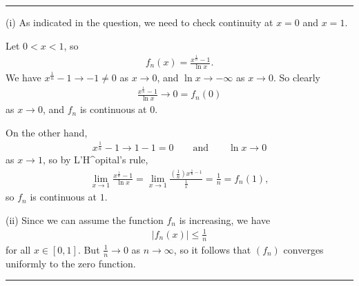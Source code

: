 \documentclass[letterpaper,10pt,english]{jupyterBook}
\begin{document}
\bigskip\hrule\bigskip


\sphinxAtStartPar
{\hyperref[\detokenize{Problems:id59}]{}}
(i) As indicated in the question, we need to check continuity at \(x=0\) and \(x=1\).

Let \(0<x<1\), so
\begin{equation*}
\begin{split}
f_n(x) = \frac{x^{\frac{1}{n}}-1}{\ln x}.
\end{split}
\end{equation*}
\sphinxAtStartPar
We have \(x^{\frac{1}{n}} -1 \rightarrow -1 \neq 0\) as \(x\rightarrow 0\), and \(\ln x\rightarrow -\infty\) as \(x\rightarrow 0\). So clearly
\begin{equation*}
\begin{split}
\frac{x^{\frac{1}{n}}-1}{\ln x} \rightarrow 0 =f_n(0)
\end{split}
\end{equation*}
\sphinxAtStartPar
as \(x\rightarrow 0\), and \(f_n\) is continuous at \(0\).

On the other hand,
\begin{equation*}
\begin{split}
x^{\frac{1}{n}} -1 \rightarrow 1-1=0 \qquad \text{and}\qquad \ln x\rightarrow 0
\end{split}
\end{equation*}
\sphinxAtStartPar
as \(x\rightarrow 1\), so by L’H\textasciicircum{}opital’s rule,
\begin{equation*}
\begin{split}
\lim_{x\rightarrow 1} \frac{x^{\frac{1}{n}} -1}{\ln x} = \lim_{x\rightarrow 1} \frac{\left(\frac{1}{n}\right)x^{\frac{1}{n}-1}}{\frac{1}{x}} = \frac{1}{n} = f_n(1),
\end{split}
\end{equation*}
\sphinxAtStartPar
so  \(f_n\) is continuous at \(1\).

\sphinxAtStartPar
(ii) Since we can assume the function \(f_n\) is increasing, we have
\begin{equation*}
\begin{split}
|f_n(x) |\leq \frac{1}{n}
\end{split}
\end{equation*}
\sphinxAtStartPar
for all \(x\in [0,1]\). But \(\frac{1}{n}\rightarrow 0\) as \(n\rightarrow \infty\), so it follows that \((f_n)\) converges uniformly to the zero function.


\bigskip\hrule\bigskip
\end{document}
